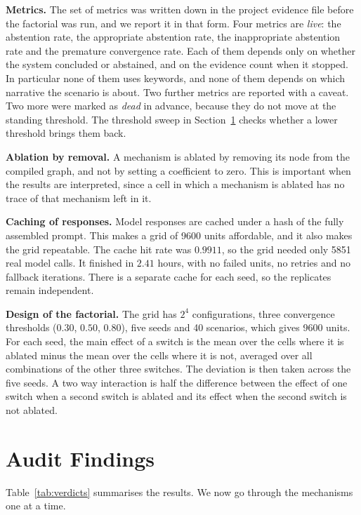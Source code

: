\documentclass[conference]{IEEEtran}
\begin{document}
\textbf{Metrics.}
The set of metrics was written down in the project evidence file before the
factorial was run, and we report it in that form. Four metrics are
\emph{live}: the abstention rate, the appropriate abstention rate, the
inappropriate abstention rate and the premature convergence rate. Each of them
depends only on whether the system concluded or abstained, and on the evidence
count when it stopped. In particular none of them uses keywords, and none of
them depends on which narrative the scenario is about. Two further metrics are
reported with a caveat. Two more were marked as \emph{dead} in advance, because
they do not move at the standing threshold. The threshold sweep in
Section~\ref{sec:findings} checks whether a lower threshold brings them back.

\textbf{Ablation by removal.}
A mechanism is ablated by removing its node from the compiled graph, and not by
setting a coefficient to zero. This is important when the results are
interpreted, since a cell in which a mechanism is ablated has no trace of that
mechanism left in it.

\textbf{Caching of responses.}
Model responses are cached under a hash of the fully assembled prompt. This
makes a grid of 9600 units affordable, and it also makes the grid repeatable.
The cache hit rate was $0.9911$, so the grid needed only 5851 real model
calls. It finished in $2.41$ hours, with no failed units, no retries and no
fallback iterations. There is a separate cache for each seed, so the
replicates remain independent.

\textbf{Design of the factorial.}
The grid has $2^4$ configurations, three convergence thresholds ($0.30$,
$0.50$, $0.80$), five seeds and 40 scenarios, which gives 9600 units. For each
seed, the main effect of a switch is the mean over the cells where it is
ablated minus the mean over the cells where it is not, averaged over all
combinations of the other three switches. The deviation is then taken across
the five seeds. A two way interaction is half the difference between the
effect of one switch when a second switch is ablated and its effect when the
second switch is not ablated.

\section{Audit Findings}
\label{sec:findings}

Table~\ref{tab:verdicts} summarises the results. We now go through the
mechanisms one at a time.
\end{document}
